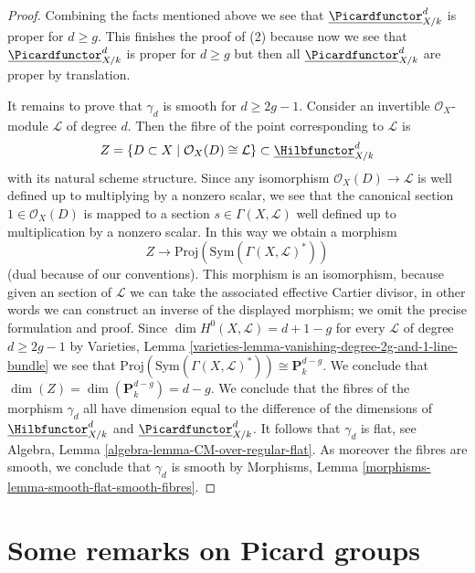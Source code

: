 \begin{proof}
\medskip\noindent
Combining the facts mentioned above we see that
$\underline{\Picardfunctor}^d_{X/k}$ is proper for $d \geq g$.
This finishes the proof of (2) because now we see that
$\underline{\Picardfunctor}^d_{X/k}$ is proper for $d \geq g$ but
then all $\underline{\Picardfunctor}^d_{X/k}$ are proper by translation.

\medskip\noindent
It remains to prove that $\gamma_d$ is smooth for $d \geq 2g - 1$.
Consider an invertible $\mathcal{O}_X$-module $\mathcal{L}$ of degree
$d$. Then the fibre of the point corresponding to $\mathcal{L}$ is
$$
Z = \{D \subset X \mid \mathcal{O}_X(D) \cong \mathcal{L}\} \subset
\underline{\Hilbfunctor}^d_{X/k}
$$
with its natural scheme structure. Since any isomorphism
$\mathcal{O}_X(D) \to \mathcal{L}$ is well defined up
to multiplying by a nonzero scalar, we see that the canonical
section $1 \in \mathcal{O}_X(D)$ is mapped to a section
$s \in \Gamma(X, \mathcal{L})$ well defined up to multiplication
by a nonzero scalar. In this way we obtain a morphism
$$
Z \longrightarrow
\text{Proj}(\text{Sym}(\Gamma(X, \mathcal{L})^*))
$$
(dual because of our conventions). This morphism is an isomorphism,
because given an section of $\mathcal{L}$ we can take the associated
effective Cartier divisor, in other words we can construct an inverse of
the displayed morphism; we omit the precise formulation and proof.
Since $\dim H^0(X, \mathcal{L}) = d + 1 - g$ for every
$\mathcal{L}$ of degree $d \geq 2g - 1$ by
Varieties, Lemma \ref{varieties-lemma-vanishing-degree-2g-and-1-line-bundle}
we see that $\text{Proj}(\text{Sym}(\Gamma(X, \mathcal{L})^*))
\cong \mathbf{P}^{d - g}_k$.
We conclude that $\dim(Z) = \dim(\mathbf{P}^{d - g}_k) = d - g$.
We conclude that the fibres of the morphism $\gamma_d$ all
have dimension equal to the difference of the dimensions of
$\underline{\Hilbfunctor}^d_{X/k}$ and $\underline{\Picardfunctor}^d_{X/k}$.
It follows that $\gamma_d$ is flat, see
Algebra, Lemma \ref{algebra-lemma-CM-over-regular-flat}.
As moreover the fibres are smooth, we conclude that $\gamma_d$
is smooth by Morphisms, Lemma \ref{morphisms-lemma-smooth-flat-smooth-fibres}.
\end{proof}





\section{Some remarks on Picard groups}
\label{section-remarks-picard}


